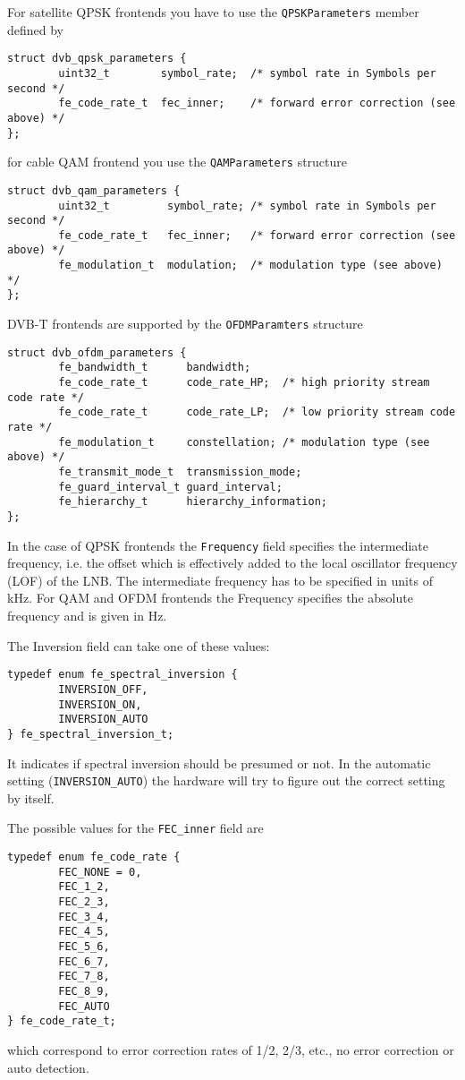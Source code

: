 For satellite QPSK frontends you have to use the \verb|QPSKParameters| member 
defined by
\begin{verbatim}
struct dvb_qpsk_parameters {
        uint32_t        symbol_rate;  /* symbol rate in Symbols per second */
        fe_code_rate_t  fec_inner;    /* forward error correction (see above) */
};
\end{verbatim}
for cable QAM frontend you use the \verb|QAMParameters| structure
\begin{verbatim}
struct dvb_qam_parameters {
        uint32_t         symbol_rate; /* symbol rate in Symbols per second */
        fe_code_rate_t   fec_inner;   /* forward error correction (see above) */
        fe_modulation_t  modulation;  /* modulation type (see above) */
};
\end{verbatim}
DVB-T frontends are supported by the \verb|OFDMParamters| structure
\begin{verbatim}
struct dvb_ofdm_parameters {
        fe_bandwidth_t      bandwidth;
        fe_code_rate_t      code_rate_HP;  /* high priority stream code rate */
        fe_code_rate_t      code_rate_LP;  /* low priority stream code rate */
        fe_modulation_t     constellation; /* modulation type (see above) */
        fe_transmit_mode_t  transmission_mode;
        fe_guard_interval_t guard_interval;
        fe_hierarchy_t      hierarchy_information;
};
\end{verbatim}

In the case of QPSK frontends the \verb|Frequency| field specifies the 
intermediate frequency, i.e. the offset which is effectively added to the 
local oscillator frequency (LOF) of the LNB.
The intermediate frequency has to be specified in units of kHz.
For QAM and OFDM frontends the Frequency specifies the absolute frequency
and is given in Hz.

The Inversion field can take one of these values:
\begin{verbatim}
typedef enum fe_spectral_inversion {
        INVERSION_OFF,
        INVERSION_ON,
        INVERSION_AUTO
} fe_spectral_inversion_t;
\end{verbatim}
It indicates if spectral inversion should be presumed or not. 
In the automatic setting (\verb|INVERSION_AUTO|) the hardware will
try to figure out the correct setting by itself.

\noindent
The possible values for the \verb|FEC_inner| field are
\begin{verbatim}
typedef enum fe_code_rate {
        FEC_NONE = 0,
        FEC_1_2,
        FEC_2_3,
        FEC_3_4,
        FEC_4_5,
        FEC_5_6,
        FEC_6_7,
        FEC_7_8,
        FEC_8_9,
        FEC_AUTO
} fe_code_rate_t;
\end{verbatim}
which correspond to error correction rates of 1/2, 2/3, etc.,
no error correction or auto detection.

